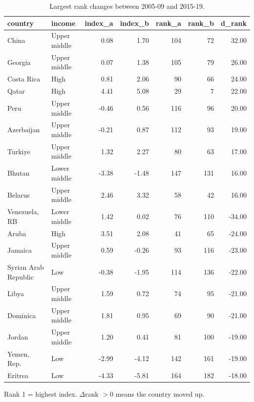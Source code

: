 \begin{table}[t]
\centering
\caption{Largest rank changes between 2005-09 and 2015-19.}
\label{tab:movers}
\small
\begin{tabular}{llrrrrr}
\toprule
\textbf{country} & \textbf{income} & \textbf{index_a} & \textbf{index_b} & \textbf{rank_a} & \textbf{rank_b} & \textbf{d_rank} \\
\midrule
China & Upper middle & 0.08 & 1.70 & 104 & 72 & 32.00 \\
Georgia & Upper middle & 0.07 & 1.38 & 105 & 79 & 26.00 \\
Costa Rica & High & 0.81 & 2.06 & 90 & 66 & 24.00 \\
Qatar & High & 4.41 & 5.08 & 29 & 7 & 22.00 \\
Peru & Upper middle & -0.46 & 0.56 & 116 & 96 & 20.00 \\
Azerbaijan & Upper middle & -0.21 & 0.87 & 112 & 93 & 19.00 \\
Turkiye & Upper middle & 1.32 & 2.27 & 80 & 63 & 17.00 \\
Bhutan & Lower middle & -3.38 & -1.48 & 147 & 131 & 16.00 \\
Belarus & Upper middle & 2.46 & 3.32 & 58 & 42 & 16.00 \\
Venezuela, RB & Lower middle & 1.42 & 0.02 & 76 & 110 & -34.00 \\
Aruba & High & 3.51 & 2.08 & 41 & 65 & -24.00 \\
Jamaica & Upper middle & 0.59 & -0.26 & 93 & 116 & -23.00 \\
Syrian Arab Republic & Low & -0.38 & -1.95 & 114 & 136 & -22.00 \\
Libya & Upper middle & 1.59 & 0.72 & 74 & 95 & -21.00 \\
Dominica & Upper middle & 1.81 & 0.95 & 69 & 90 & -21.00 \\
Jordan & Upper middle & 1.20 & 0.41 & 81 & 100 & -19.00 \\
Yemen, Rep. & Low & -2.99 & -4.12 & 142 & 161 & -19.00 \\
Eritrea & Low & -4.33 & -5.81 & 164 & 182 & -18.00 \\
\bottomrule
\end{tabular}
\vspace{2pt}\parbox{0.92\linewidth}{\footnotesize Rank 1 = highest index. $\Delta$rank $>0$ means the country moved up.}
\end{table}
